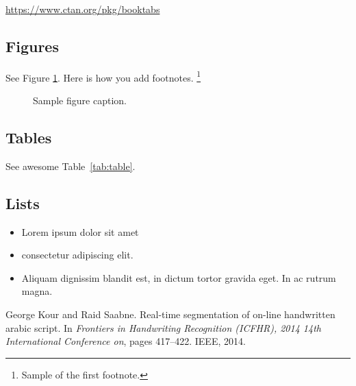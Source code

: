\documentclass{article}
\begin{document}
\begin{center}
  \url{https://www.ctan.org/pkg/booktabs}
\end{center}


\subsection{Figures}
 
See Figure \ref{fig:fig1}. Here is how you add footnotes. \footnote{Sample of the first footnote.}


\begin{figure}
  \centering
  \fbox{\rule[-.5cm]{4cm}{4cm} \rule[-.5cm]{4cm}{0cm}}
  \caption{Sample figure caption.}
  \label{fig:fig1}
\end{figure}

\subsection{Tables}

See awesome Table~\ref{tab:table}.


\subsection{Lists}
\begin{itemize}
\item Lorem ipsum dolor sit amet
\item consectetur adipiscing elit. 
\item Aliquam dignissim blandit est, in dictum tortor gravida eget. In ac rutrum magna.
\end{itemize}


  


\begin{thebibliography}{1}

George Kour and Raid Saabne.
\newblock Real-time segmentation of on-line handwritten arabic script.
\newblock In {\em Frontiers in Handwriting Recognition (ICFHR), 2014 14th
  International Conference on}, pages 417--422. IEEE, 2014.



\end{thebibliography}
\end{document}
